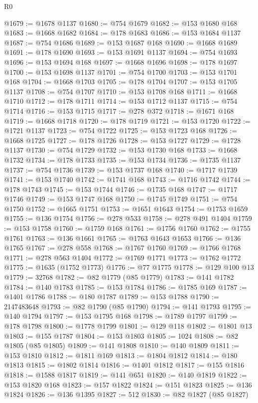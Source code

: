 \begin{lexlean}{R0}
\begin{coremodule}
@1679 := @1678 @1137
@1680 := @754 @1679
@1682 := @153 @1680 @168
@1683 := @1668 @1682
@1684 := @178 @1683
@1686 := @153 @1684 @1137
@1687 := @754 @1686
@1689 := @153 @1687 @168
@1690 := @1668 @1689
@1691 := @178 @1690
@1693 := @153 @1691 @1137
@1694 := @754 @1693
@1696 := @153 @1694 @168
@1697 := @1668 @1696
@1698 := @178 @1697
@1700 := @153 @1698 @1137
@1701 := @754 @1700
@1703 := @153 @1701 @168
@1704 := @1668 @1703
@1705 := @178 @1704
@1707 := @153 @1705 @1137
@1708 := @754 @1707
@1710 := @153 @1708 @168
@1711 := @1668 @1710
@1712 := @178 @1711
@1714 := @153 @1712 @1137
@1715 := @754 @1714
@1716 := @153 @1715
@1717 := @278 @372
@1718 := @1671 @168
@1719 := @1668 @1718
@1720 := @178 @1719
@1721 := @153 @1720
@1722 := @1721 @1137
@1723 := @754 @1722
@1725 := @153 @1723 @168
@1726 := @1668 @1725
@1727 := @178 @1726
@1728 := @153 @1727
@1729 := @1728 @1137
@1730 := @754 @1729
@1732 := @153 @1730 @168
@1733 := @1668 @1732
@1734 := @178 @1733
@1735 := @153 @1734
@1736 := @1735 @1137
@1737 := @754 @1736
@1739 := @153 @1737 @168
@1740 := @1717 @1739
@1741 := @153 @1740
@1742 := @1741 @168
@1743 := @1716 @1742
@1744 := @178 @1743
@1745 := @153 @1744
@1746 := @1735 @168
@1747 := @1717 @1746
@1749 := @153 @1747 @168
@1750 := @1745 @1749
@1751 := @754 @1750
@1752 := @1665 @1751
@1753 := @1651 @1643
@1754 := @1753 @1659
@1755 := @136 @1754
@1756 := @278 @533
@1758 := @278 @491 @1404
@1759 := @153 @1758
@1760 := @1759 @168
@1761 := @1756 @1760
@1762 := @1755 @1761
@1763 := @136 @1661
@1765 := @1763 @1643 @1653
@1766 := @136 @1765
@1767 := @278 @558
@1768 := @1767 @1760
@1769 := @1766 @1768
@1771 := @278 @563 @1404
@1772 := @1769 @1771
@1773 := @1762 @1772
@1775 := @1635 (@1752 @1773)
@1776 := @77 @1775
@1778 := @129 @100 @13
@1779 := 32768
@1782 := @82 @1779 (@85 @1779)
@1783 := @141 @1782
@1784 := @140 @1783
@1785 := @153 @1784
@1786 := @1785 @169
@1787 := @1401 @1786
@1788 := @180 @1787
@1789 := @153 @1788
@1790 := 2147483648
@1793 := @82 @1790 (@85 @1790)
@1794 := @141 @1793
@1795 := @140 @1794
@1797 := @153 @1795 @168
@1798 := @1789 @1797
@1799 := @178 @1798
@1800 := @1778 @1799
@1801 := @129 @118
@1802 := @1801 @13
@1803 := @155 @1787
@1804 := @153 @1803
@1805 := 1024
@1808 := @82 @1805 (@85 @1805)
@1809 := @141 @1808
@1810 := @140 @1809
@1811 := @153 @1810
@1812 := @1811 @169
@1813 := @1804 @1812
@1814 := @180 @1813
@1815 := @1802 @1814
@1816 := @1401 @1812
@1817 := @155 @1816
@1818 := @1588 @1817
@1819 := @141 @651
@1820 := @140 @1819
@1822 := @153 @1820 @168
@1823 := @157 @1822
@1824 := @151 @1823
@1825 := @136 @1824
@1826 := @136 @1395
@1827 := 512
@1830 := @82 @1827 (@85 @1827)

\end{coremodule}
\end{lexlean}
